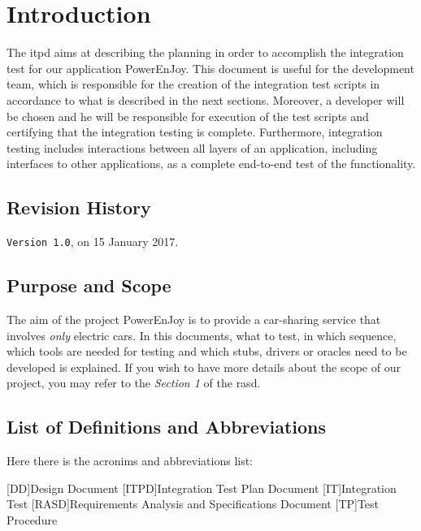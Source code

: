 \section{Introduction} \label{sec:intro}

The \acl{itpd} aims at describing the planning in order to accomplish the integration test for our application PowerEnJoy. 
This document is useful for the development team, which is responsible for the creation of the integration test scripts in accordance to what is described in the next sections. Moreover, a developer will be chosen and he will be responsible for execution of the test scripts and certifying that the integration testing is complete. Furthermore, integration testing includes interactions between all layers of an application, including interfaces to other applications, as a complete end-to-end test of the functionality. 

\subsection{Revision History}
\texttt{Version 1.0}, on 15 January 2017.

\subsection{Purpose and Scope}
The aim of the project PowerEnJoy is to provide a car-sharing service that involves \textit{only} electric cars. In this documents, what to test, in which sequence, which tools are needed for testing and which stubs, drivers or oracles need to be developed is explained. If you wish to have more details about the scope of our project, you may refer to the \textit{Section 1} of the \acl{rasd}.

\subsection{List of Definitions and Abbreviations}
Here there is the acronims and abbreviations list:

\begin{acronym}[DD] %

[DD]{Design Document}
[ITPD]{Integration Test Plan Document}
[IT]{Integration Test}
[RASD]{Requirements Analysis and Specifications Document}
[TP]{Test Procedure}

\end{acronym}

